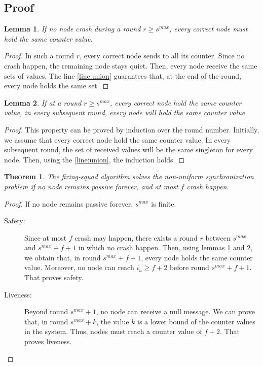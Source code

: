 \documentclass{article}
\newtheorem{lemma}{Lemma}[section]
\newtheorem{theorem}{Theorem}
\begin{document}
\subsection{Proof}

\begin{lemma} \label{lem:sync}
	If no node crash during a round $r \geq s^{max}$, every correct node must hold the same counter value.
\end{lemma}
\begin{proof}
	In such a round $r$, every correct node sends to all its counter.
	Since no crash happen, the remaining node stays quiet.
	Then, every node receive the same sets of values. The line \ref{line:union} guarantees that, at the end of the round, every node holds the same set.
\end{proof}

\begin{lemma} \label{lem:remain-synced}
	If at a round $r \geq s^{max}$, every correct node hold the same counter value, in every subsequent round, every node will hold the same counter value.
\end{lemma}
\begin{proof}
	This property can be proved by induction over the round number.
	Initially, we assume that every correct node hold the same counter value.
	In every subsequent round, the set of received values will be the same singleton for every node.
	Then, using the \ref{line:union}, the induction holds.
\end{proof}

\begin{theorem}
	The firing-squad algorithm solves the non-uniform synchronization problem if no node remains passive forever, and at most $f$ crash happen.
\end{theorem}
\begin{proof}
	If no node remains passive forever, $s^{max}$ is finite.
	\begin{description}
		\item[Safety:] Since at most $f$ crash may happen, there exists a round $r$ between $s^{max}$ and $s^{max}+f+1$ in which no crash happen.
			Then, using lemmas \ref{lem:sync} and \ref{lem:remain-synced}, we obtain that, in round $s^{max}+f+1$, every node holds the same counter value.
			Moreover, no node can reach $i_u \geq f+2$ before round $s^{max}+f+1$. 
			That proves safety.
		\item[Liveness:] Beyond round $s^{max}+1$, no node can receive a null message.
			We can prove that, in round $s^{max}+k$, the value $k$ is a lower bound of the counter values in the system.
			Thus, nodes must reach a counter value of $f+2$. That proves liveness.
	\end{description}
\end{proof}
\end{document}

